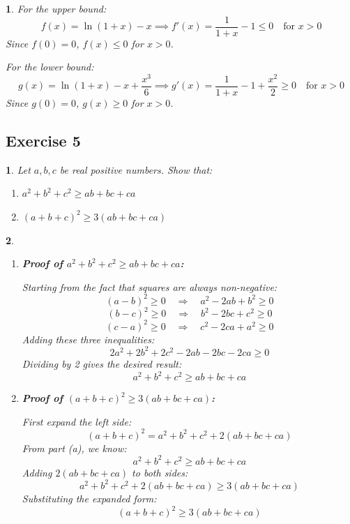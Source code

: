 \documentclass[12pt]{article}
\newtheorem{problem}{}
\newtheorem*{solution}{}
\begin{document}
\begin{solution}
For the upper bound:
\[
f(x) = \ln(1 + x) - x \implies f'(x) = \frac{1}{1 + x} - 1 \leq 0 \quad \text{for } x > 0
\]
Since \( f(0) = 0 \), \( f(x) \leq 0 \) for \( x > 0 \).

For the lower bound:
\[
g(x) = \ln(1 + x) - x + \frac{x^3}{6} \implies g'(x) = \frac{1}{1 + x} - 1 + \frac{x^2}{2} \geq 0 \quad \text{for } x > 0
\]
Since \( g(0) = 0 \), \( g(x) \geq 0 \) for \( x > 0 \).
\end{solution}

\subsection*{Exercise 5}
\begin{problem}
Let \( a, b, c \) be real positive numbers. Show that:
\begin{enumerate}
    \item \( a^2 + b^2 + c^2 \geq ab + bc + ca \)
    \item \( (a + b + c)^2 \geq 3(ab + bc + ca) \)
\end{enumerate}
\end{problem}

\begin{solution}
\begin{enumerate}
    \item \textbf{Proof of \( a^2 + b^2 + c^2 \geq ab + bc + ca \):}
    
    Starting from the fact that squares are always non-negative:
    \[
    (a-b)^2 \geq 0 \quad \Rightarrow \quad a^2 - 2ab + b^2 \geq 0
    \]
    \[
    (b-c)^2 \geq 0 \quad \Rightarrow \quad b^2 - 2bc + c^2 \geq 0
    \]
    \[
    (c-a)^2 \geq 0 \quad \Rightarrow \quad c^2 - 2ca + a^2 \geq 0
    \]
    Adding these three inequalities:
    \[
    2a^2 + 2b^2 + 2c^2 - 2ab - 2bc - 2ca \geq 0
    \]
    Dividing by 2 gives the desired result:
    \[
    a^2 + b^2 + c^2 \geq ab + bc + ca
    \]
    
    \item \textbf{Proof of \( (a + b + c)^2 \geq 3(ab + bc + ca) \):}
    
    First expand the left side:
    \[
    (a + b + c)^2 = a^2 + b^2 + c^2 + 2(ab + bc + ca)
    \]
    From part (a), we know:
    \[
    a^2 + b^2 + c^2 \geq ab + bc + ca
    \]
    Adding \( 2(ab + bc + ca) \) to both sides:
    \[
    a^2 + b^2 + c^2 + 2(ab + bc + ca) \geq 3(ab + bc + ca)
    \]
    Substituting the expanded form:
    \[
    (a + b + c)^2 \geq 3(ab + bc + ca)
    \]
\end{enumerate}


\end{solution}
\end{document}
